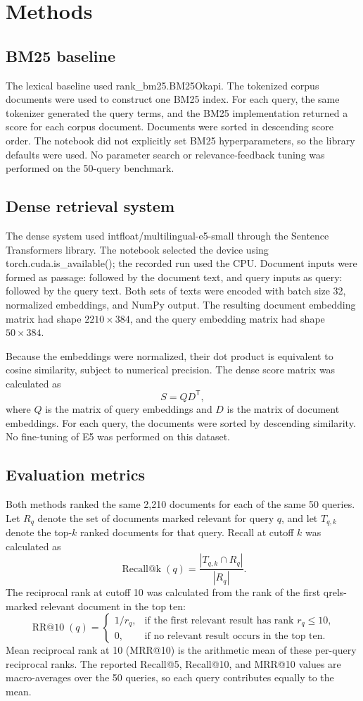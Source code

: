 \documentclass[10pt]{article}
\begin{document}
\section{Methods}
\subsection{BM25 baseline}
The lexical baseline used rank\_bm25.BM25Okapi. The tokenized corpus documents were used to construct one BM25 index. For each query, the same tokenizer generated the query terms, and the BM25 implementation returned a score for each corpus document. Documents were sorted in descending score order. The notebook did not explicitly set BM25 hyperparameters, so the library defaults were used. No parameter search or relevance-feedback tuning was performed on the 50-query benchmark.

\subsection{Dense retrieval system}
The dense system used intfloat/multilingual-e5-small through the Sentence Transformers library. The notebook selected the device using torch.cuda.is\_available(); the recorded run used the CPU. Document inputs were formed as passage:  followed by the document text, and query inputs as query:  followed by the query text. Both sets of texts were encoded with batch size 32, normalized embeddings, and NumPy output. The resulting document embedding matrix had shape $2210\times384$, and the query embedding matrix had shape $50\times384$.

Because the embeddings were normalized, their dot product is equivalent to cosine similarity, subject to numerical precision. The dense score matrix was calculated as
\[
S = QD^{\mathsf T},
\]
where $Q$ is the matrix of query embeddings and $D$ is the matrix of document embeddings. For each query, the documents were sorted by descending similarity. No fine-tuning of E5 was performed on this dataset.

\subsection{Evaluation metrics}
Both methods ranked the same 2,210 documents for each of the same 50 queries. Let $R_q$ denote the set of documents marked relevant for query $q$, and let $T_{q,k}$ denote the top-$k$ ranked documents for that query. Recall at cutoff $k$ was calculated as
\[
\operatorname{Recall@k}(q)=\frac{|T_{q,k}\cap R_q|}{|R_q|}.
\]
The reciprocal rank at cutoff 10 was calculated from the rank of the first qrels-marked relevant document in the top ten:
\[
\operatorname{RR@10}(q)=\begin{cases}
1/r_q,&\text{if the first relevant result has rank }r_q\leq10,\\
0,&\text{if no relevant result occurs in the top ten.}
\end{cases}
\]
Mean reciprocal rank at 10 (MRR@10) is the arithmetic mean of these per-query reciprocal ranks. The reported Recall@5, Recall@10, and MRR@10 values are macro-averages over the 50 queries, so each query contributes equally to the mean.
\end{document}

